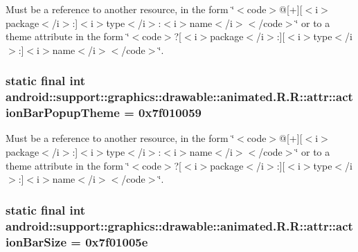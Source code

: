 Must be a reference to another resource, in the form \char`\"{}$<$code$>$@\mbox{[}+\mbox{]}\mbox{[}$<$i$>$package$<$/i$>$:\mbox{]}$<$i$>$type$<$/i$>$:$<$i$>$name$<$/i$>$$<$/code$>$\char`\"{} or to a theme attribute in the form \char`\"{}$<$code$>$?\mbox{[}$<$i$>$package$<$/i$>$:\mbox{]}\mbox{[}$<$i$>$type$<$/i$>$:\mbox{]}$<$i$>$name$<$/i$>$$<$/code$>$\char`\"{}. \hypertarget{classandroid_1_1support_1_1graphics_1_1drawable_1_1animated_1_1_r_1_1attr_8b0a60735b485157af40117b4a048ea7}{
\subsubsection[{actionBarPopupTheme}]{\setlength{\rightskip}{0pt plus 5cm}static final int android::support::graphics::drawable::animated.R.R::attr::actionBarPopupTheme = 0x7f010059}}
\label{classandroid_1_1support_1_1graphics_1_1drawable_1_1animated_1_1_r_1_1attr_8b0a60735b485157af40117b4a048ea7}


Must be a reference to another resource, in the form \char`\"{}$<$code$>$@\mbox{[}+\mbox{]}\mbox{[}$<$i$>$package$<$/i$>$:\mbox{]}$<$i$>$type$<$/i$>$:$<$i$>$name$<$/i$>$$<$/code$>$\char`\"{} or to a theme attribute in the form \char`\"{}$<$code$>$?\mbox{[}$<$i$>$package$<$/i$>$:\mbox{]}\mbox{[}$<$i$>$type$<$/i$>$:\mbox{]}$<$i$>$name$<$/i$>$$<$/code$>$\char`\"{}. \hypertarget{classandroid_1_1support_1_1graphics_1_1drawable_1_1animated_1_1_r_1_1attr_dfa97a2f94343e7b092349f424f283bc}{
\subsubsection[{actionBarSize}]{\setlength{\rightskip}{0pt plus 5cm}static final int android::support::graphics::drawable::animated.R.R::attr::actionBarSize = 0x7f01005e}}
\label{classandroid_1_1support_1_1graphics_1_1drawable_1_1animated_1_1_r_1_1attr_dfa97a2f94343e7b092349f424f283bc}


